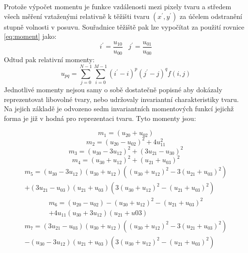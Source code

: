 \documentclass[11pt,twoside,a4paper,table]{book}
\begin{document}
Protože výpočet momentu je funkce vzdálenosti mezi pixely tvaru a středem všech měření vztaženými relativně k těžišti tvaru $(x^\prime, y^\prime)$  za účelem odstranění stupně volnosti v posuvu. Souřadnice těžiště pak lze vypočítat za použití rovnice \ref{eq:moment} jako:
\begin{equation}
i^\prime = \frac{u_{10}}{u_{00}} \,\,\,\,\, j^\prime = \frac{u_{01}}{u_{00}}
\end{equation}
Odtud pak relativní momenty:
\begin{equation}
u_{pq} = \sum^{N-1}_{j=0}\sum^{M-1}_{i=0} (i^\prime - i)^p (j^\prime -j)^q f(i,j)
\end{equation}
Jednotlivé momenty nejsou samy o sobě dostatečně popisné aby dokázaly reprezentovat libovolné tvary, nebo udržovaly invariantní charakteristiky tvaru. Na jejich základě je odvozeno sedm invariantních momentových funkcí jejichž forma je již v hodná pro reprezentaci tvaru. Tyto momenty jsou:

\begin{equation}
m_1 = (u_{20} + u_{02})
\label{eq:hu1}
\end{equation}
\begin{equation}
m_2 = (u_{20} - u_{02})^2 + 4u^2_{11}
\end{equation}
\begin{equation}
m_3 = (u_{30} - 3u_{12})^2 + (3u_{21} - u_{30})^2
\end{equation}
\begin{equation}
m_4 = (u_{30} + u_{12})^2 + (u_{21} + u_{03})^2
\end{equation}
\begin{equation}
\begin{split}
m_5 = (u_{30} - 3u_{12})(u_{30} + u_{12})((u_{30} + u_{12})^2 - 3(u_{21} + u_{03})^2)\\
+ (3u_{21} - u_{03})(u_{21} + u_{03}) (3(u_{30} + u_{12})^2 - (u_{21} + u_{03})^2)
\end{split}
\end{equation}
\begin{equation}
\begin{split}
m_6 = (u_{20} - u_{02}) - (u_{30} + u_{12})^2 - (u_{21} + u_{03})^2 \\
+ 4u_{11}(u_{30} + 3u_{12})(u_{21} + u{03})
\end{split}
\end{equation}
\begin{equation}
\begin{split}
m_7 = (3u_{21} - u_{03})(u_{30} + u_{12}) ((u_{30} + u_{12})^2 - 3(u_{21} + u_{03})^2)\\
- (u_{30} - 3u_{12})(u_{21} + u_{03})(3(u_{30} + u_{12})^2 - (u_{21} + u_{03})^2)
\end{split}
\label{eq:hu7}
\end{equation}
\end{document}

